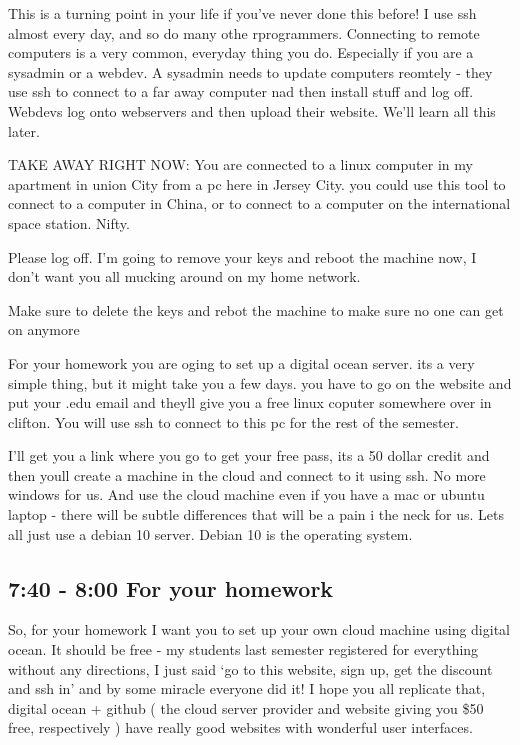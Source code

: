 \documentclass[10pt]{article}
\begin{document}
This is a turning point in your life if you've never done this before! I use ssh
almost every day, and so do many othe rprogrammers. Connecting to remote
computers is a very common, everyday thing you do. Especially if you are a
sysadmin or a webdev. A sysadmin needs to update computers reomtely - they use
ssh to connect to a far away computer nad then install stuff and log off.
Webdevs log onto webservers and then upload their website. We'll learn all this
later.

TAKE AWAY RIGHT NOW: You are connected to a linux computer in my apartment in
union City from a pc here in Jersey City. you could use this tool to connect to
a computer in China, or to connect to a computer on the international space
station. Nifty.

Please log off. I'm going to remove your keys and reboot the machine now, I
don't want you all mucking around on my home network.

{\LARGE Make sure to delete the keys and rebot the machine to make sure no one
can get on anymore}

For your homework you are oging to set up a digital ocean server. its a very
simple thing, but it might take you a few days. you have to go on the website
and put your .edu email and theyll give you a free linux coputer somewhere over
in clifton. You will use ssh to connect to this pc for the rest of the semester.

I'll get you a link where you go to get your free pass, its a 50 dollar credit
and then youll create a machine in the cloud and connect to it using ssh. No
more windows for us. And use the cloud machine even if you have a mac or ubuntu
laptop - there will be subtle differences that will be a pain i the neck for us.
Lets all just use a debian 10 server. Debian 10 is the operating system.


\subsection{ 7:40 - 8:00 For your homework}

So, for your homework I want you to set up your own cloud machine using digital
ocean. It should be free - my students last semester registered for everything
without any directions, I just said `go to this website, sign up, get the
discount and ssh in' and by some miracle everyone did it! I hope you all
replicate that, digital ocean + github ( the cloud server provider and website
giving you \$50 free, respectively ) have really good websites  with wonderful
user interfaces.
\end{document}
